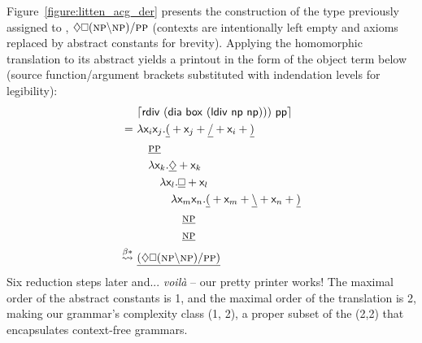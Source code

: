 Figure~\ref{figure:litten_acg_der} presents the construction of the type previously assigned to , $\diamond\bx (\np[s]\divleft\np[s])\divright\pp[s]$ (contexts are intentionally left empty and axioms replaced by abstract constants for brevity).
Applying the homomorphic translation to its abstract yields a printout in the form of the object term below (source function/argument brackets substituted with indendation levels for legibility):
\begin{equation}
	{
	\begin{aligned}
	& 			\hm{\term{rdiv~(dia~box~(ldiv~np~np)))~pp}}\\
	= \
	&				\smallterm{\lam  \vari\varj.\underline{(} + \varj + \underline{\divright} + \vari + \underline{)}}\\
	& \quad			\underline{\smallprop{pp}}\\
	& \quad 		\smallterm{\lam  \vark.\underline{\diamond} + \vark}\\
	& \qquad 		\smallterm{\lam  \varl.\underline{\bx} + \varl}\\
	& \qqquad		\smallterm{\lam  \Var{m}\Var{n}.\underline{(} + \Var{m} + \underline{\divleft} + \Var{n} + \underline{)}} \\
	& \qqqquad		\underline{\smallprop{np}}\\
	& \qqqquad		\underline{\smallprop{np}}\\
	\bredstar \
	&				\underline{(
						\diamond \bx ( \np \divleft \np )
						\divright \pp[s] 
						)}
	\end{aligned}
	}
\end{equation}
Six reduction steps later and... \textit{voil\`{a}} -- our pretty printer works!
The maximal order of the abstract constants is 1, and the maximal order of the translation is 2, making our grammar's complexity class (1, 2), a proper subset of the (2,2) that encapsulates context-free grammars.

